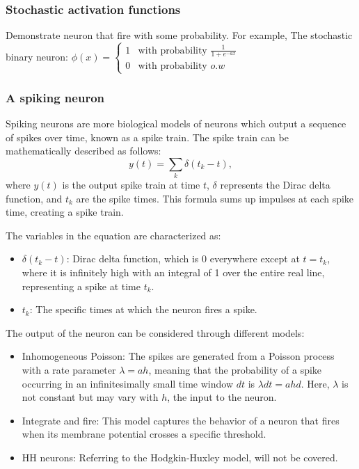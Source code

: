 \documentclass[11pt]{book} %
\begin{document}
\subsubsection{Stochastic activation functions}
Demonstrate neuron that fire with some probability.
For example, The stochastic binary neuron: $\phi(x) = \begin{cases} 1 & \text{with probability } \frac{1}{1 + e^{-ax}} \\ 0 & \text{with probability } o.w \end{cases}$
    
\subsubsection{A spiking neuron}
Spiking neurons are more biological models of neurons which output a sequence of spikes over time, known as a spike train. The spike train can be mathematically described as follows:
\[
y(t) = \sum_k \delta(t_k - t),
\]
where \( y(t) \) is the output spike train at time \( t \), \( \delta \) represents the Dirac delta function, and \( t_k \) are the spike times. This formula sums up impulses at each spike time, creating a spike train.

The variables in the equation are characterized as:
\begin{itemize}
    \item \( \delta(t_k - t) \): Dirac delta function, which is 0 everywhere except at \( t = t_k \), where it is infinitely high with an integral of 1 over the entire real line, representing a spike at time \( t_k \).
    \item \( t_k \): The specific times at which the neuron fires a spike.
\end{itemize}

The output of the neuron can be considered through different models:
\begin{itemize}
    \item Inhomogeneous Poisson: The spikes are generated from a Poisson process with a rate parameter \( \lambda = ah \), meaning that the probability of a spike occurring in an infinitesimally small time window \( dt \) is \( \lambda dt = ahd\). Here, \( \lambda \) is not constant but may vary with \( h \), the input to the neuron.
    \item Integrate and fire: This model captures the behavior of a neuron that fires when its membrane potential crosses a specific threshold.
    \item HH neurons: Referring to the Hodgkin-Huxley model, will not be covered.
\end{itemize}
\end{document}
